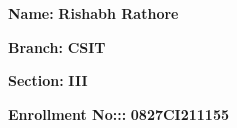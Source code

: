 \documentclass[12pt,,a4paper]{article}
\begin{document}
\textbf{\fontsize{14}{\baselineskip}\selectfont Name:} \hspace{\fill} \textbf{\fontsize{14}{\baselineskip}\selectfont Rishabh Rathore}
\bigskip

\textbf{\fontsize{14}{\baselineskip}\selectfont Branch:} \hspace{\fill} \textbf{\fontsize{14}{\baselineskip}\selectfont CSIT}


\bigskip

\textbf{\fontsize{14}{\baselineskip}\selectfont Section:} \hspace{\fill} \textbf{\fontsize{14}{\baselineskip}\selectfont III}

\bigskip

\textbf{\fontsize{14}{\baselineskip}\selectfont Enrollment No:::} \hspace{\fill} \textbf{\fontsize{14}{\baselineskip}\selectfont 0827CI211155}
\clearpage

\end{document}
